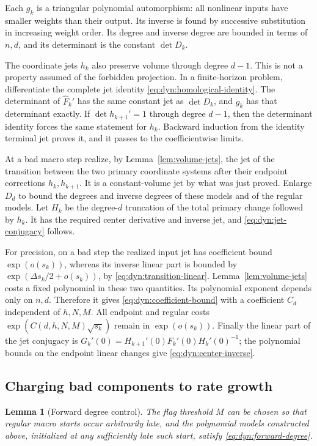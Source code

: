 \documentclass[11pt]{article}
\newtheorem{lemma}[theorem]{Lemma}
\theoremstyle{definition}
\theoremstyle{remark}
\numberwithin{equation}{section}
\begin{document}
Each $g_k$ is a triangular polynomial automorphism: all nonlinear
inputs have smaller weights than their output.  Its inverse is found
by successive substitution in increasing weight order.  Its degree
and inverse degree are bounded in terms of $n,d$, and its determinant
is the constant $\det D_k$.

The coordinate jets $h_k$ also preserve volume through degree $d-1$.
This is not a property assumed of the forbidden projection.  In a
finite-horizon problem, differentiate the complete jet identity
\eqref{eq:dyn:homological-identity}.  The determinant of
$\widehat F_k'$ has the same constant jet as $\det D_k$, and $g_k$ has
that determinant exactly.  If $\det h_{k+1}'=1$ through degree $d-1$,
then the determinant identity forces the same statement for $h_k$.
Backward induction from the identity terminal jet proves it, and it
passes to the coefficientwise limits.

At a bad macro step realize, by Lemma~\ref{lem:volume-jets}, the jet of
the transition between the two primary coordinate systems after their
endpoint corrections $h_k,h_{k+1}$.  It is a constant-volume jet by
what was just proved.  Enlarge $D_d$ to bound the degrees and inverse
degrees of these models and of the regular models.
Let $H_k$ be the degree-$d$ truncation of the total primary change
followed by $h_k$.  It has the required center derivative and inverse
jet, and \eqref{eq:dyn:jet-conjugacy} follows.

For precision, on a bad step the realized input jet has coefficient
bound $\exp(o(s_k))$, whereas its inverse linear part is bounded by
$\exp(\Delta s_k/2+o(s_k))$, by
\eqref{eq:dyn:transition-linear}.  Lemma~\ref{lem:volume-jets} costs a
fixed polynomial in these two quantities.  Its polynomial exponent
depends only on $n,d$.  Therefore it gives
\eqref{eq:dyn:coefficient-bound} with a coefficient $C_d$ independent
of $h,N,M$.  All endpoint and regular costs
$\exp(C(d,h,N,M)\sqrt{s_k})$ remain in $\exp(o(s_k))$.
Finally the linear part of the jet conjugacy is
$G_k'(0)=H_{k+1}'(0)F_k'(0)H_k'(0)^{-1}$; the polynomial bounds on the
endpoint linear changes give \eqref{eq:dyn:center-inverse}.

\subsection{Charging bad components to rate growth}

\begin{lemma}[Forward degree control]\label{lem:degree-control}
The flag threshold $M$ can be chosen so that regular macro starts
occur arbitrarily late, and the polynomial models constructed above,
initialized at any sufficiently late such start, satisfy
\eqref{eq:dyn:forward-degree}.
\end{lemma}
\end{document}

